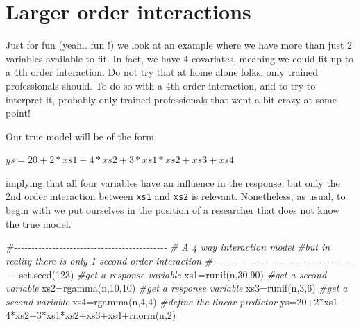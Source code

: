 \documentclass[
]{book}
\newenvironment{Shaded}{\begin{snugshade}}{\end{snugshade}}
\newcommand{\CommentTok}[1]{\textcolor[rgb]{0.56,0.35,0.01}{\textit{#1}}}
\newcommand{\DecValTok}[1]{\textcolor[rgb]{0.00,0.00,0.81}{#1}}
\newcommand{\FunctionTok}[1]{\textcolor[rgb]{0.00,0.00,0.00}{#1}}
\newcommand{\NormalTok}[1]{#1}
\newcommand{\OtherTok}[1]{\textcolor[rgb]{0.56,0.35,0.01}{#1}}
\newcommand{\SpecialCharTok}[1]{\textcolor[rgb]{0.00,0.00,0.00}{#1}}
\begin{document}
\hypertarget{larger-order-interactions}{%
\section{Larger order interactions}\label{larger-order-interactions}}

Just for fun (yeah.. fun !) we look at an example where we have more than just 2 variables available to fit. In fact, we have 4 covariates, meaning we could fit up to a 4th order interaction. Do not try that at home alone folks, only trained professionals should. To do so with a 4th order interaction, and to try to interpret it, probably only trained professionals that went a bit crazy at some point!

Our true model will be of the form

\(ys=20+2*xs1-4*xs2+3*xs1*xs2+xs3+xs4\)

implying that all four variables have an influence in the response, but only the 2nd order interaction between \texttt{xs1} and \texttt{xs2} is relevant. Nonetheless, as usual, to begin with we put ourselves in the position of a researcher that does not know the true model.

\begin{Shaded}
\begin{Highlighting}[]
\CommentTok{\#{-}{-}{-}{-}{-}{-}{-}{-}{-}{-}{-}{-}{-}{-}{-}{-}{-}{-}{-}{-}{-}{-}{-}{-}{-}{-}{-}{-}{-}{-}{-}{-}{-}{-}{-}{-}{-}{-}{-}{-}{-}{-}{-}{-}}
\CommentTok{\# A 4 way interaction model}
\CommentTok{\#but in reality there is only 1 second order interaction}
\CommentTok{\#{-}{-}{-}{-}{-}{-}{-}{-}{-}{-}{-}{-}{-}{-}{-}{-}{-}{-}{-}{-}{-}{-}{-}{-}{-}{-}{-}{-}{-}{-}{-}{-}{-}{-}{-}{-}{-}{-}{-}{-}{-}{-}{-}{-}}
\FunctionTok{set.seed}\NormalTok{(}\DecValTok{123}\NormalTok{)}
\CommentTok{\#get a response variable}
\NormalTok{xs1}\OtherTok{=}\FunctionTok{runif}\NormalTok{(n,}\DecValTok{30}\NormalTok{,}\DecValTok{90}\NormalTok{)}
\CommentTok{\#get a second variable}
\NormalTok{xs2}\OtherTok{=}\FunctionTok{rgamma}\NormalTok{(n,}\DecValTok{10}\NormalTok{,}\DecValTok{10}\NormalTok{)}
\CommentTok{\#get a response variable}
\NormalTok{xs3}\OtherTok{=}\FunctionTok{runif}\NormalTok{(n,}\DecValTok{3}\NormalTok{,}\DecValTok{6}\NormalTok{)}
\CommentTok{\#get a second variable}
\NormalTok{xs4}\OtherTok{=}\FunctionTok{rgamma}\NormalTok{(n,}\DecValTok{4}\NormalTok{,}\DecValTok{4}\NormalTok{)}
\CommentTok{\#define the linear predictor}
\NormalTok{ys}\OtherTok{=}\DecValTok{20}\SpecialCharTok{+}\DecValTok{2}\SpecialCharTok{*}\NormalTok{xs1}\DecValTok{{-}4}\SpecialCharTok{*}\NormalTok{xs2}\SpecialCharTok{+}\DecValTok{3}\SpecialCharTok{*}\NormalTok{xs1}\SpecialCharTok{*}\NormalTok{xs2}\SpecialCharTok{+}\NormalTok{xs3}\SpecialCharTok{+}\NormalTok{xs4}\SpecialCharTok{+}\FunctionTok{rnorm}\NormalTok{(n,}\DecValTok{2}\NormalTok{)}
\end{Highlighting}
\end{Shaded}
\end{document}
